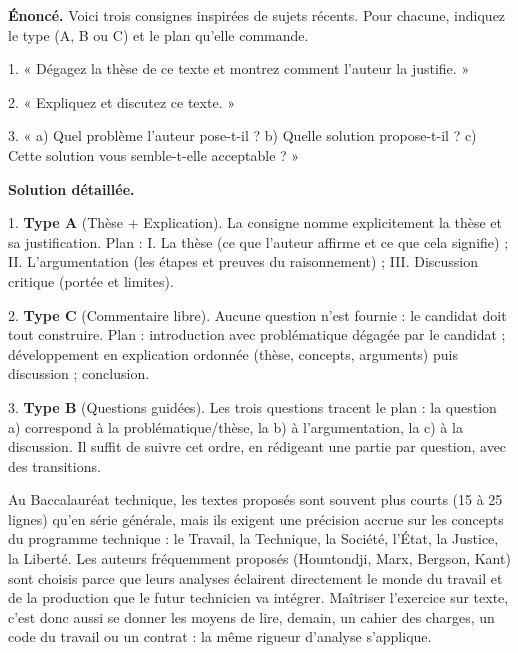 \documentclass[11pt]{article}
\newcommand{\cle}[1]{{\popxbold\color{popdark}#1}}
\begin{document}
\begin{exoresolu}
\textbf{Énoncé.} Voici trois consignes inspirées de sujets récents. Pour chacune, indiquez le type (A, B ou C) et le plan qu'elle commande.

1. « Dégagez la thèse de ce texte et montrez comment l'auteur la justifie. »

2. « Expliquez et discutez ce texte. »

3. « a) Quel problème l'auteur pose-t-il ? b) Quelle solution propose-t-il ? c) Cette solution vous semble-t-elle acceptable ? »

\tcblower
\textbf{Solution détaillée.}

1. \textbf{Type A} (Thèse + Explication). La consigne nomme explicitement la thèse et sa justification. Plan : I. La thèse (ce que l'auteur affirme et ce que cela signifie) ; II. L'argumentation (les étapes et preuves du raisonnement) ; III. Discussion critique (portée et limites).

2. \textbf{Type C} (Commentaire libre). Aucune question n'est fournie : le candidat doit tout construire. Plan : introduction avec problématique dégagée par le candidat ; développement en explication ordonnée (thèse, concepts, arguments) puis discussion ; conclusion.

3. \textbf{Type B} (Questions guidées). Les trois questions tracent le plan : la question a) correspond à la problématique/thèse, la b) à l'argumentation, la c) à la discussion. Il suffit de suivre cet ordre, en rédigeant une partie par question, avec des transitions.
\end{exoresolu}

\begin{savaistu}
Au Baccalauréat technique, les textes proposés sont souvent plus courts (15 à 25 lignes) qu'en série générale, mais ils exigent une précision accrue sur les concepts du programme technique : le \cle{Travail}, la \cle{Technique}, la \cle{Société}, l'État, la Justice, la Liberté. Les auteurs fréquemment proposés (Hountondji, Marx, Bergson, Kant) sont choisis parce que leurs analyses éclairent directement le monde du travail et de la production que le futur technicien va intégrer. Maîtriser l'exercice sur texte, c'est donc aussi se donner les moyens de lire, demain, un cahier des charges, un code du travail ou un contrat : la même rigueur d'analyse s'applique.
\end{savaistu}
\end{document}
